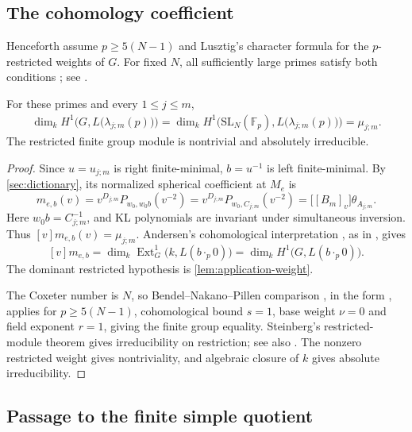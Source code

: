 \documentclass[a4paper,11pt]{amsart}
\numberwithin{equation}{subsection}
\theoremstyle{plain}
\theoremstyle{definition}
\theoremstyle{remark}
\begin{document}
\subsection{The cohomology coefficient}

Henceforth assume $p\ge5(N-1)$ and Lusztig's character formula
for the $p$-restricted weights of $G$. For fixed $N$,
all sufficiently large primes satisfy both conditions \cite{AJS};
see \cite[Theorem~3.1]{Luebeck}.

\begin{lemma}\label{prop:application-transfer}
For these primes and every $1\le j\le m$,
\begin{gather*}
\dim_k H^1\Big(G,L\big(\lambda_{j;m}(p)\big)\Big)
=\dim_k H^1\Big(\mathrm{SL}_N(\mathbb F_p),L\big(\lambda_{j;m}(p)\big)\Big)
=\mu_{j;m}.
\end{gather*}
The restricted finite group module is nontrivial and absolutely
irreducible.
\end{lemma}

\begin{proof}
Since $u=u_{j;m}$ is right finite-minimal, $b=u^{-1}$ is left
finite-minimal. By \autoref{sec:dictionary}, its normalized spherical
coefficient at $M_e$ is
\[
m_{e,b}(v)=v^{D_{j;m}}P_{w_0,w_0b}(v^{-2})
=v^{D_{j;m}}P_{w_0,C_{j;m}}(v^{-2})
=\big[[B_m]_v\big]\theta_{A_{j;m}}.
\]
Here $w_0b=C_{j;m}^{-1}$, and KL polynomials are invariant under
simultaneous inversion. Thus $[v]m_{e,b}(v)=\mu_{j;m}$.
Andersen's cohomological interpretation \cite{Andersen}, as in
\cite[Theorem~4.5]{Luebeck}, gives
\[
[v]m_{e,b}=\dim_k\operatorname{Ext}^1_{G}\big(k,L(b\cdot_p0)\big)
=\dim_k H^1\big(G,L(b\cdot_p0)\big).
\]
The dominant restricted hypothesis is \autoref{lem:application-weight}.

The Coxeter number is $N$, so Bendel--Nakano--Pillen comparison
\cite[Theorem~7.5]{BNP}, in the form \cite[Theorem~4.6]{Luebeck},
applies for $p\ge5(N-1)$, cohomological bound $s=1$, base weight
$\nu=0$ and field exponent $r=1$, giving the finite group equality.
Steinberg's restricted-module theorem
\cite[Sections~1.3, 6.1 and 7.4]{Steinberg} gives irreducibility on
restriction; see also \cite[Proposition~5.3]{Luebeck}.
The nonzero restricted weight gives nontriviality, and algebraic
closure of $k$ gives absolute irreducibility.
\end{proof}

\subsection{Passage to the finite simple quotient}
\end{document}
